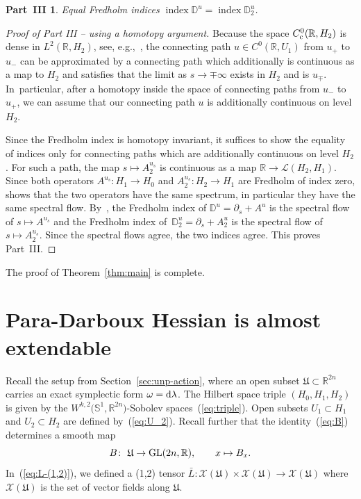 \documentclass[pdftex]{sigma}
\numberwithin{equation}{section}
\newtheorem*{PartIII}{Part~III}
\newcommand{\D}{{\mathbb{D}}}
\newcommand{\R}{{\mathbb{R}}}
\renewcommand{\SS}{{\mathbb{S}}}
\newcommand{\Ll}{{\mathcal{L}}} %
\newcommand{\Xx}{{\mathcal{X}}}
\newcommand{\INDEX}{\mathop{\mathrm{index}}} %
\newcommand{\GL}{{\rm GL}}
\newcommand{\p}{{\partial}}
\newcommand{\1}{{{\mathchoice {\rm 1\mskip-4mu l} {\rm 1\mskip-4mu l}
{\rm 1\mskip-4.5mu l} {\rm 1\mskip-5mu l}}}}
\begin{document}
\begin{PartIII} Equal Fredholm indices $\INDEX \D^u=\INDEX \D^u_2$.
\end{PartIII}

\begin{proof}[Proof of Part III -- using a homotopy argument]
Because the space $C^0_{\rm c}(\R,H_2)$ is dense in $L^2(\R,H_2)$,
see, e.g.,~\cite[Theorem~A.5.4]{Frauenfelder:2025e},
the connecting path $u\in C^0(\R,U_1)$ from $u_+$ to $u_-$
can be approximated by a connecting path
which additionally is
continuous as a map to $H_2$ and satisfies
that the limit as $s\to\mp\infty$ exists in $H_2$ and is $u_{\mp}$.
In~particular, after a homotopy inside the space of connecting paths from
$u_-$ to $u_+$, we can assume that our connecting path $u$ is
additionally continuous on level $H_2$.

Since the Fredholm index is homotopy invariant,
it suffices to show the equality of indices only for connecting paths
which are additionally continuous on level $H_2$.
For such a path, the map $s\mapsto A^{u_s}_2$ is continuous as a map
$\R\to\Ll(H_2,H_1)$.
Since both operators $A^{u_s}\colon H_1\to H_0$ and
$A^{u_s}_2\colon H_2\to H_1$ are Fredholm of index zero, \cite[Corollary~3.4]{Frauenfelder:2024c}
shows that the two operators have the same spectrum, in particular
they have the same spectral flow.
By~\cite[Theorem~A]{Frauenfelder:2024d},
the Fredholm index of $\D^u=\p_s+A^u$ is the spectral flow of
$s\mapsto A^{u_s}$
and
the Fredholm index of~${\D^u_2=\p_s+A^u_2}$ is the spectral flow of
$s\mapsto A^{u_s}_2$.
Since the spectral flows agree, the two indices agree.
This proves Part~III.
\end{proof}

The proof of Theorem~\ref{thm:main} is complete.

\section{Para-Darboux Hessian is almost extendable}

Recall the setup from Section~\ref{sec:unp-action},
where an open subset $\mathfrak{U}\subset\R^{2n}$
carries an exact symplectic form $\omega={\rm d}\lambda$.
The Hilbert space triple $(H_0,H_1,H_2)$ is given by the
$W^{k,2}\bigl(\SS^1,\R^{2n}\bigr)$-Sobolev spaces~(\ref{eq:triple}).
Open subsets $U_1\subset H_1$ and $U_2\subset H_2$
are defined by~(\ref{eq:U_2}).
Recall further that the identity~(\ref{eq:B})
determines a smooth map
\[
 B\colon\ \mathfrak{U}\to\GL(2n,\R)
 ,\qquad
 x\mapsto B_x .
\]
In~(\ref{eq:L-(1,2)}), we defined a (1,2) tensor
$\bar L\colon \Xx(\mathfrak{U}) \times \Xx(\mathfrak{U})
\to \Xx(\mathfrak{U})$ where $\Xx(\mathfrak{U})$ is the set of vector
fields along $\mathfrak{U}$.
\end{document}

